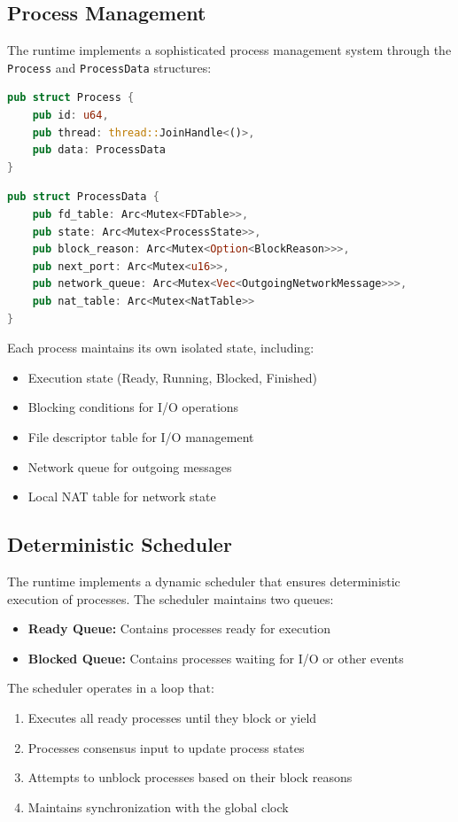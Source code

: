 \documentclass[10pt]{IEEEtran}
\begin{document}
\subsection{Process Management}

The runtime implements a sophisticated process management system through the \texttt{Process} and \texttt{ProcessData} structures:

\begin{lstlisting}[language=Rust]
pub struct Process {
    pub id: u64,
    pub thread: thread::JoinHandle<()>,
    pub data: ProcessData
}
\end{lstlisting}
\begin{lstlisting}[language=Rust]
pub struct ProcessData {
    pub fd_table: Arc<Mutex<FDTable>>,    
    pub state: Arc<Mutex<ProcessState>>,  
    pub block_reason: Arc<Mutex<Option<BlockReason>>>,
    pub next_port: Arc<Mutex<u16>>,
    pub network_queue: Arc<Mutex<Vec<OutgoingNetworkMessage>>>,
    pub nat_table: Arc<Mutex<NatTable>> 
}
\end{lstlisting}

Each process maintains its own isolated state, including:
\begin{itemize}
    \item Execution state (Ready, Running, Blocked, Finished)
    \item Blocking conditions for I/O operations
    \item File descriptor table for I/O management
    \item Network queue for outgoing messages
    \item Local NAT table for network state
\end{itemize}

\subsection{Deterministic Scheduler}

The runtime implements a dynamic scheduler that ensures deterministic execution of processes. The scheduler maintains two queues:

\begin{itemize}
    \item \textbf{Ready Queue:} Contains processes ready for execution
    \item \textbf{Blocked Queue:} Contains processes waiting for I/O or other events
\end{itemize}

The scheduler operates in a loop that:
\begin{enumerate}
    \item Executes all ready processes until they block or yield
    \item Processes consensus input to update process states
    \item Attempts to unblock processes based on their block reasons
    \item Maintains synchronization with the global clock
\end{enumerate}
\end{document}
